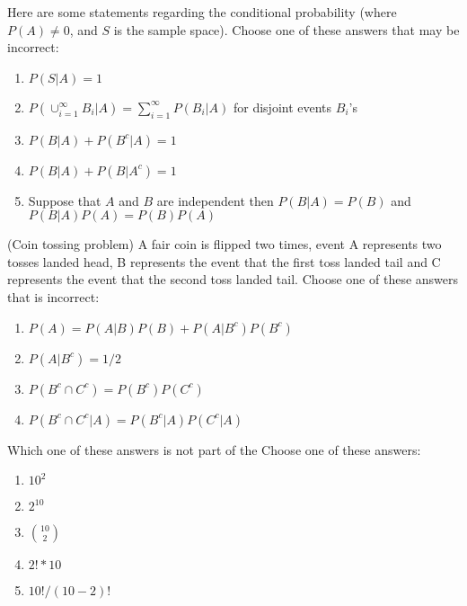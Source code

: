 \documentclass[poll_tutorial_format]{subfiles}
\begin{document}
	
	\begin{exercise}
		Here are some statements regarding the conditional probability (where $P(A)\neq 0$, and $S$ is the sample space).
		Choose one of these answers that may be incorrect: %
		\begin{enumerate}
			\item $P(S|A)=1$
			\item $P(\cup_{i=1}^\infty B_i|A) = \sum_{i=1}^\infty P(B_i|A)$ for disjoint events $B_i$'s
			\item $P(B|A)+P(B^c|A)=1$
			\item $P(B|A)+P(B|A^c)=1$ 
			\item Suppose that $A$ and $B$ are independent then $P(B|A)=P(B)$ and $P(B|A)P(A)=P(B)P(A)$ 
		\end{enumerate}
	\end{exercise}
	
	
	\begin{exercise}
		(Coin tossing problem) A fair coin is flipped two times, event A represents two tosses landed head, B represents the event that the first toss landed tail and C represents the event that the second toss landed tail. 
		Choose one of these answers that is incorrect: %
		\begin{enumerate}
			\item $P(A)=P(A|B)P(B)+P(A|B^c)P(B^c)$ %
			\item $P(A|B^c)=1/2$
			\item $P(B^c\cap C^c)=P(B^c)P(C^c)$ %
			\item $P(B^c\cap C^c|A)=P(B^c|A)P(C^c|A) $  
		\end{enumerate}
	\end{exercise}
	
	
	
	\begin{exercise}
		Which one of these answers is not part of the 
		Choose one of these answers: %
		\begin{enumerate}
			\item $10^2$
			\item $2^{10}$
			\item ${10\choose 2}$
			\item $2! * 10$
			\item $10!/(10-2)!$
		\end{enumerate}
	\end{exercise}
	
	
	
	
	
	
\end{document}
